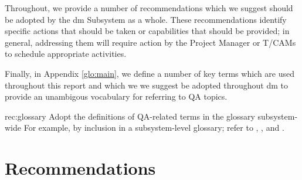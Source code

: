 \documentclass[DM,authoryear,toc,lsstdraft]{lsstdoc}
\makeatletter
\newcommand{\printrecs}{%
  \section{Recommendations}%
  \label{sec:recs}
  \begin{enumerate}[leftmargin=7em,label=QAWG-REC-\arabic*:]%
  \def\@noitemerr{\@latex@warning{Empty objective list}}%
  \@starttoc{rec}%
  \end{enumerate}%
}
\makeatother
\begin{document}
Throughout, we provide a number of recommendations which we suggest should be
adopted by the \gls{dm} Subsystem as a whole. These recommendations identify
specific actions that should be taken or capabilities that should be provided;
in general, addressing them will require action by the Project Manager or
T/CAMs to schedule appropriate activities.

Finally, in Appendix \ref{glo:main}, we define a number of key terms which are
used throughout this report and which we we suggest be adopted throughout
\gls{dm} to provide an unambigous vocabulary for referring to QA topics.

\begin{recommendation}
    {rec:glossary}
    {Adopt the definitions of QA-related terms in the  glossary subsystem-wide}
For example, by inclusion in a subsystem-level glossary; refer to
, , and .
\end{recommendation}





\appendix
\printrecs
\glsaddall
\renewcommand*{\glsautoprefix}{glo:}
\printglossary[style=index,numberedsection=autolabel]



\end{document}
